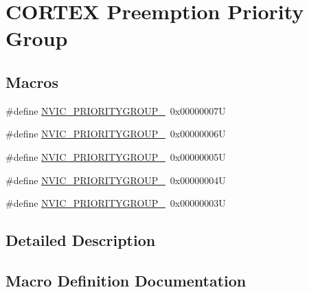 \hypertarget{group___c_o_r_t_e_x___preemption___priority___group}{}\section{C\+O\+R\+T\+EX Preemption Priority Group}
\label{group___c_o_r_t_e_x___preemption___priority___group}
\subsection*{Macros}
\begin{DoxyCompactItemize}
\item 
\#define \mbox{\hyperlink{group___c_o_r_t_e_x___preemption___priority___group_ga5e97dcff77680602c86e44f23f5ffa1a}{N\+V\+I\+C\+\_\+\+P\+R\+I\+O\+R\+I\+T\+Y\+G\+R\+O\+U\+P\+\_}}~0x00000007U
\item 
\#define \mbox{\hyperlink{group___c_o_r_t_e_x___preemption___priority___group_ga702227137b010421c3a3b6434005a132}{N\+V\+I\+C\+\_\+\+P\+R\+I\+O\+R\+I\+T\+Y\+G\+R\+O\+U\+P\+\_}}~0x00000006U
\item 
\#define \mbox{\hyperlink{group___c_o_r_t_e_x___preemption___priority___group_gaa43a3fd37850c120ce567ab2743d11b4}{N\+V\+I\+C\+\_\+\+P\+R\+I\+O\+R\+I\+T\+Y\+G\+R\+O\+U\+P\+\_}}~0x00000005U
\item 
\#define \mbox{\hyperlink{group___c_o_r_t_e_x___preemption___priority___group_ga8ddb24962e6f0fc3273139d45d374b09}{N\+V\+I\+C\+\_\+\+P\+R\+I\+O\+R\+I\+T\+Y\+G\+R\+O\+U\+P\+\_}}~0x00000004U
\item 
\#define \mbox{\hyperlink{group___c_o_r_t_e_x___preemption___priority___group_gae6eab9140204bc938255aa148e597c45}{N\+V\+I\+C\+\_\+\+P\+R\+I\+O\+R\+I\+T\+Y\+G\+R\+O\+U\+P\+\_}}~0x00000003U
\end{DoxyCompactItemize}


\subsection{Detailed Description}


\subsection{Macro Definition Documentation}
\mbox{\label{group___c_o_r_t_e_x___preemption___priority___group_ga5e97dcff77680602c86e44f23f5ffa1a}} 
